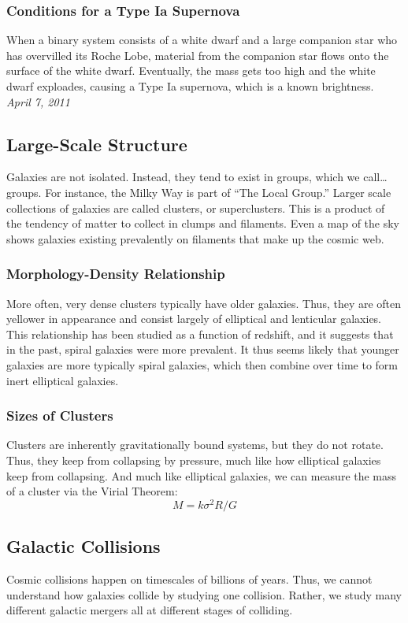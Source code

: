 \documentclass{article}
\begin{document}
	 \subsubsection{Conditions for a Type Ia Supernova}
	 When a binary system consists of a white dwarf and a large companion star who has overvilled its Roche Lobe, material from the companion star flows onto the surface of the white dwarf. Eventually, the mass gets too high and the white dwarf exploades, causing a Type Ia supernova, which is a known brightness.\\
	 
	 \noindent \textit{April 7, 2011}
	 \subsection{Large-Scale Structure}
	 Galaxies are not isolated. Instead, they tend to exist in groups, which we call\ldots groups. For instance, the Milky Way is part of ``The Local Group.'' Larger scale collections of galaxies are called clusters, or superclusters. This is a product of the tendency of matter to collect in clumps and filaments. Even a map of the sky shows galaxies existing prevalently on filaments that make up the cosmic web.
	 \subsubsection{Morphology-Density Relationship}
	 More often, very dense clusters typically have older galaxies. Thus, they are often yellower in appearance and consist largely of elliptical and lenticular galaxies. This relationship has been studied as a function of redshift, and it suggests that in the past, spiral galaxies were more prevalent. It thus seems likely that younger galaxies are more typically spiral galaxies, which then combine over time to form inert elliptical galaxies.
	 \subsubsection{Sizes of Clusters}
	 Clusters are inherently gravitationally bound systems, but they do not rotate. Thus, they keep from collapsing by pressure, much like how elliptical galaxies keep from collapsing. And much like elliptical galaxies, we can measure the mass of a cluster via the Virial Theorem:
	 $$M=k\sigma^2 R/G$$
	 \subsection{Galactic Collisions}
	 Cosmic collisions happen on timescales of billions of years. Thus, we cannot understand how galaxies collide by studying one collision. Rather, we study many different galactic mergers all at different stages of colliding.
\end{document}
